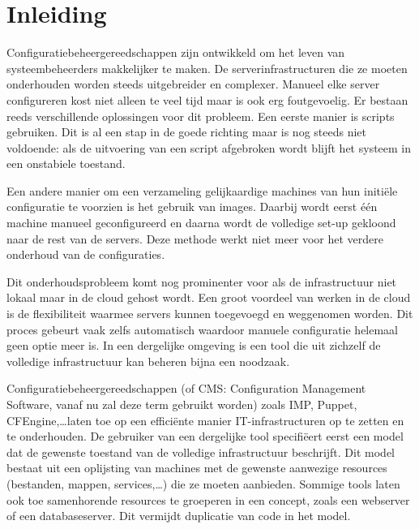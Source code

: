 \chapter{Inleiding}
\label{inleiding}
Configuratiebeheergereedschappen zijn ontwikkeld om het leven van systeembeheerders makkelijker te maken.
De serverinfrastructuren die ze moeten onderhouden worden steeds uitgebreider en complexer.
Manueel elke server configureren kost niet alleen te veel tijd maar is ook erg foutgevoelig.
Er bestaan reeds verschillende oplossingen voor dit probleem.
Een eerste manier is scripts gebruiken.
Dit is al een stap in de goede richting maar is nog steeds niet voldoende: 
als de uitvoering van een script afgebroken wordt blijft het systeem in een onstabiele toestand.\cite{sysadvent}

Een andere manier om een verzameling gelijkaardige machines van hun initi\"ele configuratie te voorzien is het gebruik van images.
Daarbij wordt eerst \'e\'en machine manueel geconfigureerd en daarna wordt de volledige set-up gekloond naar de rest van de servers.
Deze methode werkt niet meer voor het verdere onderhoud van de configuraties.

Dit onderhoudsprobleem komt nog prominenter voor als de infrastructuur niet lokaal maar in de cloud gehost wordt.
Een groot voordeel van werken in de cloud is de flexibiliteit waarmee servers kunnen toegevoegd en weggenomen worden.
Dit proces gebeurt vaak zelfs automatisch waardoor manuele configuratie helemaal geen optie meer is. 
In een dergelijke omgeving is een tool die uit zichzelf de volledige infrastructuur kan beheren bijna een noodzaak.

Configuratiebeheergereedschappen (of CMS: Configuration Management Software, vanaf nu zal deze term gebruikt worden) zoals IMP\cite{IMP}, Puppet\cite{puppet}, CFEngine\cite{cfengine},\ldots laten toe op een effici\"ente manier IT-infrastructuren op te zetten en te onderhouden.
De gebruiker van een dergelijke tool specifi\"eert eerst een model dat de gewenste toestand van de volledige infrastructuur beschrijft.
Dit model bestaat uit een oplijsting van machines met de gewenste aanwezige resources (bestanden, mappen, services,\ldots) die ze moeten aanbieden.
Sommige tools laten ook toe samenhorende resources te groeperen in een concept, zoals een webserver of een databaseserver.
Dit vermijdt duplicatie van code in het model.

